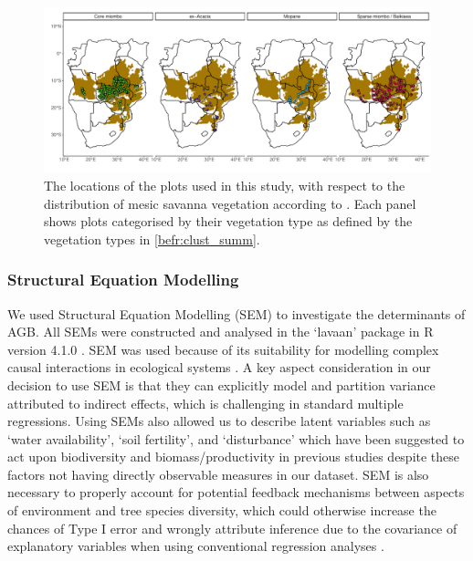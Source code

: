\begin{refsection}




\begin{landscape}
\begin{figure}[p]
\centering
	\includegraphics[width=1.4\textwidth]{img/clust_map}
	\caption[Plot locations used in analysis, grouped by vegetation type]{The locations of the \nplots{} plots used in this study, with respect to the distribution of mesic savanna vegetation according to \citet{White1987}. Each panel shows plots categorised by their vegetation type as defined by the vegetation types in \autoref{befr:clust_summ}.}
	\label{befr:clust_map}
\end{figure}
\end{landscape}

\subsubsection{Structural Equation Modelling}
\label{befr:sssec:sem}

We used Structural Equation Modelling (SEM) to investigate the determinants of AGB. All SEMs were constructed and analysed in the `lavaan' package \citep{lavaan} in R version 4.1.0 \citep{R2020}. SEM was used because of its suitability for modelling complex causal interactions in ecological systems \citep{Lee2007}. A key aspect consideration in our decision to use SEM is that they can explicitly model and partition variance attributed to indirect effects, which is challenging in standard multiple regressions. Using SEMs also allowed us to describe latent variables such as `water availability', `soil fertility', and `disturbance' which have been suggested to act upon biodiversity and biomass/productivity in previous studies despite these factors not having directly observable measures in our dataset. SEM is also necessary to properly account for potential feedback mechanisms between aspects of environment and tree species diversity, which could otherwise increase the chances of Type I error and wrongly attribute inference due to the covariance of explanatory variables when using conventional regression analyses \citep{Nachtigall2003}.


\end{refsection}
